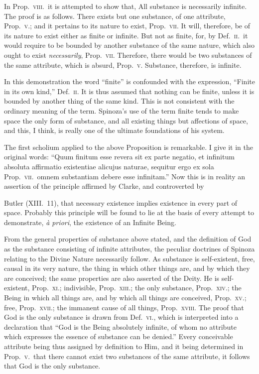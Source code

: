 \documentclass[oneside]{book}
\begin{document}
In Prop.~\textsc{viii}.\ it is attempted to show that, All substance
is necessarily infinite. The proof is as follows. There exists
but one substance, of one attribute, Prop.~\textsc{v}.; and it pertains
to its nature to exist, Prop.~\textsc{vii}. It will, therefore, be of its
nature to exist either as finite or infinite. But not as finite, for,
by Def.~\textsc{ii}.\ it would require to be bounded by another substance
of the same nature, which also ought to exist \emph{necessarily}, Prop.~\textsc{vii}. Therefore, there would be two substances of the same
attribute, which is absurd, Prop.~\textsc{v}. Substance, therefore, is
infinite.

In this demonstration the word ``finite'' is confounded with
the expression, ``Finite in its own kind,'' Def.~\textsc{ii}. It is thus assumed
that nothing can be finite, unless it is bounded by another
thing of the same kind. This is not consistent with the ordinary
meaning of the term. Spinoza's use of the term finite
tends to make space the only form of substance, and all existing
things but affections of space, and this, I think, is really one of
the ultimate foundations of his system.

The first scholium applied to the above Proposition is remarkable.
I give it in the original words: ``Quum finitum esse
revera sit ex parte negatio, et infinitum absoluta affirmatio existentiae
alicujus naturae, sequitur ergo ex sola Prop.~\textsc{vii}.\ omnem
substantiam debere esse infinitam.'' Now this is in reality an
assertion of the principle affirmed by Clarke, and controverted by

Butler (XIII.~11), that necessary existence implies existence
in every part of space. Probably this principle will be found to
lie at the basis of every attempt to demonstrate, \textit{\`{a} priori}, the
existence of an Infinite Being.

From the general properties of substance above stated, and
the definition of God as the substance consisting of infinite attributes,
the peculiar doctrines of Spinoza relating to the Divine
Nature necessarily follow. As substance is self-existent, free,
causal in its very nature, the thing in which other things are,
and by which they are conceived; the same properties are also
asserted of the Deity. He is self-existent, Prop.~\textsc{xi}.; indivisible,
Prop.~\textsc{xiii}.; the only substance, Prop.~\textsc{xiv}.; the Being in
which all things are, and by which all things are conceived,
Prop.~\textsc{xv}.; free, Prop.~\textsc{xvii}.; the immanent cause of all things,
Prop.~\textsc{xviii}. The proof that God is the only substance is drawn
from Def.~\textsc{vi}., which is interpreted into a declaration that ``God
is the Being absolutely infinite, of whom no attribute which expresses
the essence of substance can be denied.'' Every conceivable
attribute being thus assigned by definition to Him, and
it being determined in Prop.~\textsc{v}.\ that there cannot exist two substances
of the same attribute, it follows that God is the only
substance.
\end{document}
